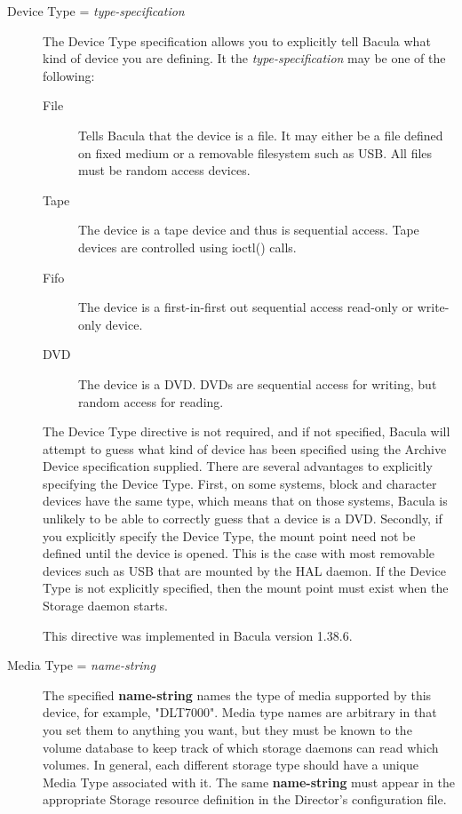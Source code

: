 \begin{description}
\item [Device Type = {\it type-specification}]
   The Device Type specification allows you to explicitly tell Bacula
   what kind of device you are defining. It the {\it type-specification}
   may be one of the following:
   \begin{description}
   \item [File]
     Tells Bacula that the device is a file. It may either be a
     file defined on fixed medium or a removable filesystem such as
     USB.  All files must be random access devices.
   \item [Tape]
     The device is a tape device and thus is sequential access. Tape devices
     are controlled using ioctl() calls.
   \item [Fifo]
     The device is a first-in-first out sequential access read-only 
     or write-only device.
   \item [DVD]
     The device is a DVD. DVDs are sequential access for writing, but
     random access for reading.
  \end{description}
  
  The Device Type directive is not required, and if not specified, Bacula
  will attempt to guess what kind of device has been specified using the
  Archive Device specification supplied. There are several advantages to
  explicitly specifying the Device Type. First, on some systems, block and
  character devices have the same type, which means that on those systems,
  Bacula is unlikely to be able to correctly guess that a device is a DVD.
  Secondly, if you explicitly specify the Device Type, the mount point
  need not be defined until the device is opened. This is the case with
  most removable devices such as USB that are mounted by the HAL daemon.
  If the Device Type is not explicitly specified, then the mount point
  must exist when the Storage daemon starts.

  This directive was implemented in Bacula version 1.38.6.


\item [Media Type = {\it name-string}]
   The specified {\bf name-string} names the type of media supported by this
   device, for example, "DLT7000".  Media type names are arbitrary in that you
   set them to anything you want, but they must be known to the volume
   database to keep track of which storage daemons can read which volumes.  In
   general, each different storage type should have a unique Media Type
   associated with it.  The same {\bf name-string} must appear in the
   appropriate Storage resource definition in the Director's configuration
   file.
   

\end{description}
